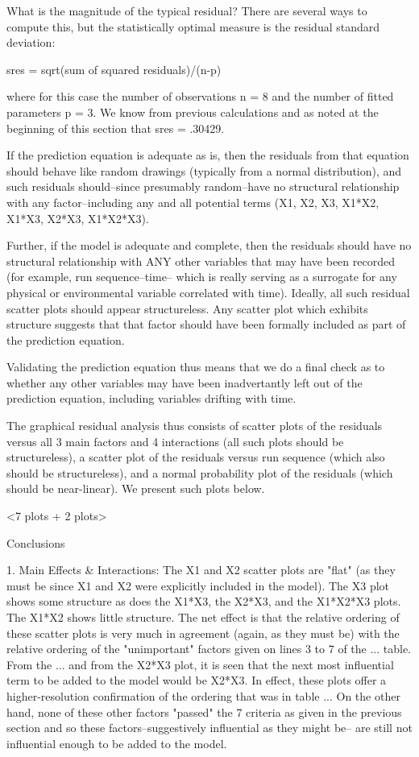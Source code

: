 What is the magnitude of the typical residual?
There are several ways to compute this, but the
statistically optimal measure is the residual
standard deviation:

   sres = sqrt(sum of squared residuals)/(n-p)

where for this case the number of observations n =
8 and the number of fitted parameters p = 3. We
know from previous calculations and as noted at
the beginning of this section that sres = .30429.

If the prediction equation is adequate as is, then
the residuals from that equation should behave
like random drawings (typically from a normal
distribution), and such residuals should--since
presumably random--have no structural relationship
with any factor--including any and all potential
terms (X1, X2, X3, X1*X2, X1*X3, X2*X3, X1*X2*X3).

Further, if the model is adequate and complete,
then the residuals should have no structural
relationship with ANY other variables that may
have been recorded (for example, run
sequence--time-- which is really serving as a
surrogate for any physical or environmental
variable correlated with time).  Ideally, all such
residual scatter plots should appear
structureless.  Any scatter plot which exhibits
structure suggests that that factor should have
been formally included as part of the prediction
equation.

Validating the prediction equation thus means that
we do a final check as to whether any other
variables may have been inadvertantly left out of
the prediction equation, including variables
drifting with time.

The graphical residual analysis thus consists of
scatter plots of the residuals versus all 3 main
factors and 4 interactions (all such plots should
be structureless), a scatter plot of the residuals
versus run sequence (which also should be
structureless), and a normal probability plot of
the residuals (which should be near-linear).  We
present such plots below.

<7 plots + 2 plots>

Conclusions

1. Main Effects & Interactions:
   The X1 and X2 scatter plots are "flat" (as they
   must be since X1 and X2 were explicitly
   included in the model).  The X3 plot shows some
   structure as does the X1*X3, the X2*X3, and the
   X1*X2*X3 plots.  The X1*X2 shows little
   structure.  The net effect is that the relative
   ordering of these scatter plots is very much in
   agreement (again, as they must be) with the
   relative ordering of the "unimportant" factors
   given on lines 3 to 7 of the ...  table.  From
   the ...  and from the X2*X3 plot, it is seen
   that the next most influential term to be added
   to the model would be X2*X3.  In effect, these
   plots offer a higher-resolution confirmation of
   the ordering that was in table ...  On the
   other hand, none of these other factors
   "passed" the 7 criteria as given in the
   previous section and so these
   factors--suggestively influential as they might
   be-- are still not influential enough to be
   added to the model.

